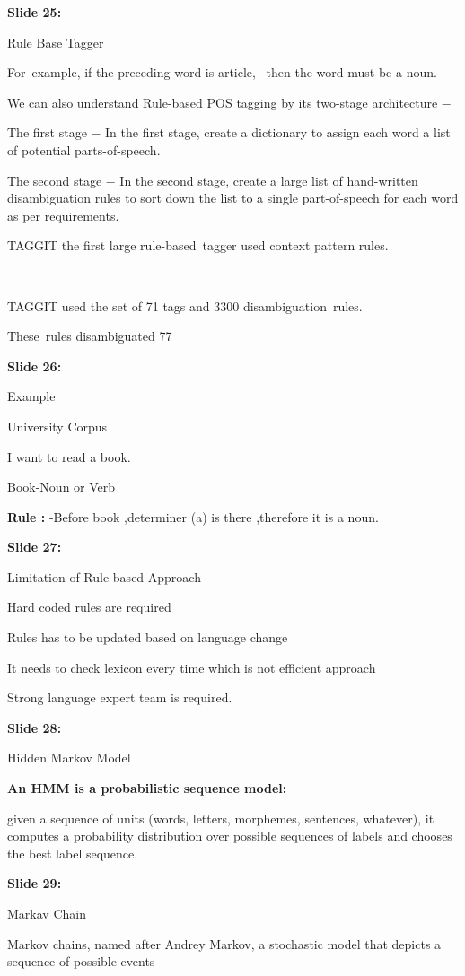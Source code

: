 \documentclass[11pt,a4paper]{article}
\begin{document}
\textbf{Slide 25:}

Rule Base Tagger

For example, if the preceding word is article,  then the word must be a noun. ​

​We can also understand Rule-based POS tagging by its two-stage architecture −

The first stage − In the first stage, create a dictionary to assign each word a list of potential parts-of-speech.

The second stage − In the second stage, create a large list of hand-written disambiguation rules to sort down the list to a single part-of-speech for each word as per requirements.

TAGGIT the first large rule-based tagger used context pattern rules.​

​

TAGGIT used the set of 71 tags and 3300 disambiguation rules.​

These rules disambiguated 77%

\textbf{Slide 26:}

Example

University Corpus

I want to read a book.

Book-Noun or Verb

\textbf{Rule :} -Before book ,determiner (a) is there ,therefore it is a noun.

\textbf{Slide 27:}

Limitation of Rule based Approach

Hard coded rules are required

Rules has to be updated based on language change

It needs to check lexicon every time which is not efficient approach

Strong language expert team is required.

\textbf{Slide 28:}

Hidden Markov Model

\textbf{An HMM is a probabilistic sequence model:} 

given a sequence of units (words, letters, morphemes, sentences, whatever), it computes a probability distribution over possible sequences of labels and chooses the best label sequence.

\textbf{Slide 29:}

Markav Chain

Markov chains, named after Andrey Markov, a stochastic model that depicts a sequence of possible events
\end{document}
